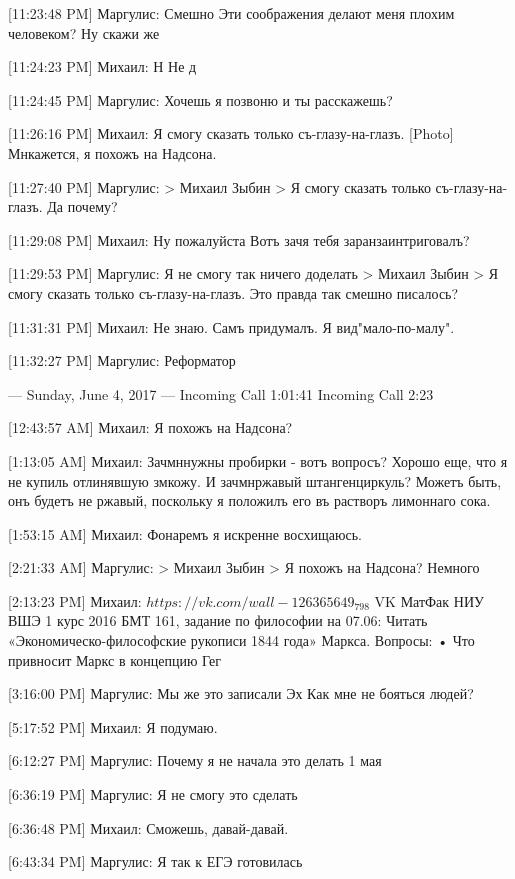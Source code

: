 \documentclass{article}
\newcommand{\yat}{{\fontencoding{X2}\selectfont\cyryat}} %
\begin{document}
[11:23:48 PM] Маргулис:
Смешно
 Эти соображения делают меня плохим человеком?
 Ну скажи же

[11:24:23 PM] Михаил:
Н
 Не д

[11:24:45 PM] Маргулис:
Хочешь я позвоню и ты расскажешь?

[11:26:16 PM] Михаил:
Я смогу сказать только съ-глазу-на-глазъ.
 [Photo]
 Мн\yat кажется, я похожъ на Надсона.

[11:27:40 PM] Маргулис:
> Михаил Зыбин
> Я смогу сказать только съ-глазу-на-глазъ.
Да почему?

[11:29:08 PM] Михаил:
Ну пожалуйста
 Вотъ зач я тебя заран заинтриговалъ?

[11:29:53 PM] Маргулис:
Я не смогу так ничего доделать
> Михаил Зыбин
> Я смогу сказать только съ-глазу-на-глазъ.
Это правда так смешно писалось?

[11:31:31 PM] Михаил:
Не знаю. Самъ придумалъ. Я вид "мало-по-малу".

[11:32:27 PM] Маргулис:
Реформатор

--- Sunday, June 4, 2017 ---
Incoming Call 1:01:41
Incoming Call 2:23

[12:43:57 AM] Михаил:
Я похожъ на Надсона?

[1:13:05 AM] Михаил:
Зач мн\yat нужны пробирки - вотъ вопросъ? Хорошо еще, что я не купиль отлинявшую зм кожу.
 И зач мн\yat ржавый штангенциркуль? Можетъ быть, онъ будетъ не ржавый, поскольку я положилъ его въ растворъ лимоннаго сока.

[1:53:15 AM] Михаил:
Фонаремъ я искренне восхищаюсь.

[2:21:33 AM] Маргулис:
> Михаил Зыбин
> Я похожъ на Надсона?
Немного

[2:13:23 PM] Михаил:
$https://vk.com/wall-126365649_798$
VK
МатФак НИУ ВШЭ 1 курс 2016
БМТ 161, задание по философии на 07.06: Читать «Экономическо-философские рукописи 1844 года» Маркса. Вопросы: • Что привносит Маркс в концепцию Гег

[3:16:00 PM] Маргулис:
Мы же это записали
 Эх
 Как мне не бояться людей?

[5:17:52 PM] Михаил:
Я подумаю.

[6:12:27 PM] Маргулис:
Почему я не начала это делать 1 мая

[6:36:19 PM] Маргулис:
Я не смогу это сделать

[6:36:48 PM] Михаил:
Сможешь, давай-давай.

[6:43:34 PM] Маргулис:
Я так к ЕГЭ готовилась
\end{document}
